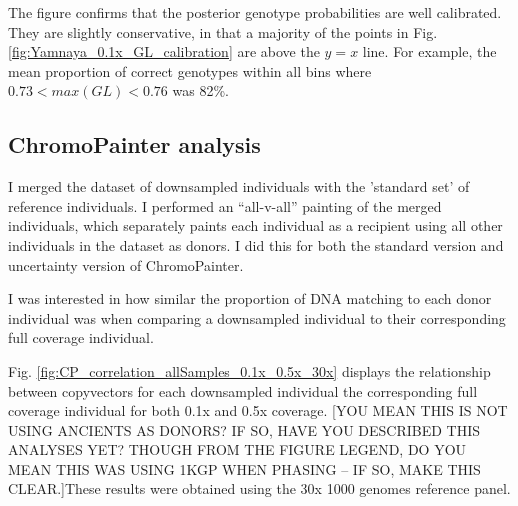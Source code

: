 The figure confirms that the posterior genotype probabilities are well calibrated. They are slightly conservative, in that a majority of the points in Fig. \ref{fig:Yamnaya_0.1x_GL_calibration} are above the $y=x$ line. For example, the mean proportion of correct genotypes within all bins where $0.73 < max(GL) < 0.76$ was 82\%.

\subsection{ChromoPainter analysis}

I merged the dataset of downsampled individuals with the 'standard set' of reference individuals. I performed an ``all-v-all'' painting of the merged individuals, which {\color{red}separately paints each individual as a recipient using all other individuals in the dataset as donors}. I did this for both the standard version and uncertainty version of ChromoPainter.

I was interested {\color{red}in how similar the proportion of DNA matching to each donor individual was when comparing a downsampled individual to their corresponding full coverage individual.} 

Fig. \ref{fig:CP_correlation_allSamples_0.1x_0.5x_30x} displays the relationship between copyvectors for each downsampled individual the corresponding full coverage individual for both 0.1x and 0.5x coverage. {\color{red}[YOU MEAN THIS IS NOT USING ANCIENTS AS DONORS? IF SO, HAVE YOU DESCRIBED THIS ANALYSES YET? THOUGH FROM THE FIGURE LEGEND, DO YOU MEAN THIS WAS USING 1KGP WHEN PHASING -- IF SO, MAKE THIS CLEAR.]These results were obtained using the 30x 1000 genomes reference panel. }

